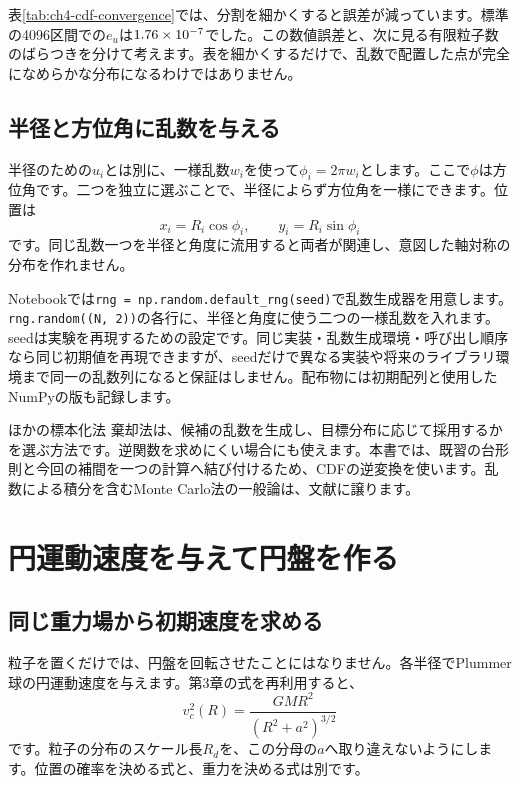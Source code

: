 表\ref{tab:ch4-cdf-convergence}では、分割を細かくすると誤差が減っています。標準の4096区間での$e_u$は$1.76\times 10^{-7}$でした。この数値誤差と、次に見る有限粒子数のばらつきを分けて考えます。表を細かくするだけで、乱数で配置した点が完全になめらかな分布になるわけではありません。

\subsection{半径と方位角に乱数を与える}
半径のための$u_i$とは別に、一様乱数$w_i$を使って$\phi_i=2\pi w_i$とします。ここで$\phi$は方位角です。二つを独立に選ぶことで、半径によらず方位角を一様にできます。位置は
\begin{equation}
x_i=R_i\cos\phi_i,\qquad y_i=R_i\sin\phi_i
\label{eq:ch4-polar-position}
\end{equation}
です。同じ乱数一つを半径と角度に流用すると両者が関連し、意図した軸対称の分布を作れません。

Notebookでは\texttt{rng = np.random.default\_rng(seed)}で乱数生成器を用意します。\texttt{rng.random((N, 2))}の各行に、半径と角度に使う二つの一様乱数を入れます。seedは実験を再現するための設定です。同じ実装・乱数生成環境・呼び出し順序なら同じ初期値を再現できますが、seedだけで異なる実装や将来のライブラリ環境まで同一の乱数列になると保証はしません。\cite{numpy}配布物には初期配列と使用したNumPyの版も記録します。

\begin{notebox}{ほかの標本化法}
棄却法は、候補の乱数を生成し、目標分布に応じて採用するかを選ぶ方法です。逆関数を求めにくい場合にも使えます。本書では、既習の台形則と今回の補間を一つの計算へ結び付けるため、CDFの逆変換を使います。乱数による積分を含むMonte Carlo法の一般論は、文献\cite{irifuji1985}に譲ります。
\end{notebox}

\section{円運動速度を与えて円盤を作る}
\label{sec:ch4-initial}
\subsection{同じ重力場から初期速度を求める}
粒子を置くだけでは、円盤を回転させたことにはなりません。各半径でPlummer球の円運動速度を与えます。第3章の式を再利用すると、
\begin{equation}
v_c^2(R)=\frac{GMR^2}{(R^2+a^2)^{3/2}}
\label{eq:ch4-circular-speed}
\end{equation}
です。粒子の分布のスケール長$R_d$を、この分母の$a$へ取り違えないようにします。位置の確率を決める式と、重力を決める式は別です。

